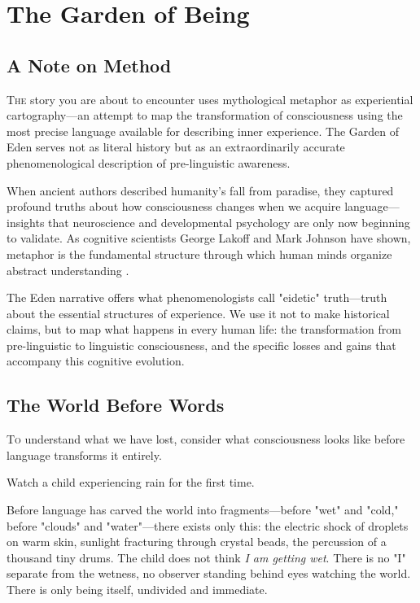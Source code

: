 \chapter{The Garden of Being}

\section{A Note on Method}

\lettrine{T}{he} story you are about to encounter uses mythological metaphor as experiential cartography—an attempt to map the transformation of consciousness using the most precise language available for describing inner experience. The Garden of Eden serves not as literal history but as an extraordinarily accurate phenomenological description of pre-linguistic awareness.

When ancient authors described humanity's fall from paradise, they captured profound truths about how consciousness changes when we acquire language—insights that neuroscience and developmental psychology are only now beginning to validate. As cognitive scientists George Lakoff and Mark Johnson have shown, metaphor is the fundamental structure through which human minds organize abstract understanding \parencite{lakoff1980metaphors}.

The Eden narrative offers what phenomenologists call "eidetic" truth—truth about the essential structures of experience. We use it not to make historical claims, but to map what happens in every human life: the transformation from pre-linguistic to linguistic consciousness, and the specific losses and gains that accompany this cognitive evolution.

\section{The World Before Words}

\lettrine{T}{o} understand what we have lost, consider what consciousness looks like before language transforms it entirely.

Watch a child experiencing rain for the first time. 

Before language has carved the world into fragments—before "wet" and "cold," before "clouds" and "water"—there exists only this: the electric shock of droplets on warm skin, sunlight fracturing through crystal beads, the percussion of a thousand tiny drums. The child does not think \textit{I am getting wet}. There is no "I" separate from the wetness, no observer standing behind eyes watching the world. There is only being itself, undivided and immediate.


